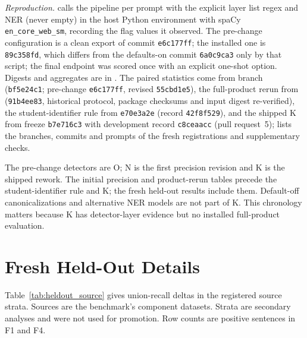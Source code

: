 \documentclass[sigconf]{acmart}
\theoremstyle{acmdefinition}\newtheorem{property}{Property}
\begin{document}
\textit{Reproduction.}  calls the pipeline per prompt with the explicit layer list regex and NER (never empty) in the host Python environment with spaCy \texttt{en\_core\_web\_sm}, recording the flag values it observed. The pre-change configuration is a clean export of commit \texttt{e6c177ff}; the installed one is \texttt{89c358fd}, which differs from the defaults-on commit \texttt{6a0c9ca3} only by that script; the final endpoint was scored once with an explicit one-shot option. Digests and aggregates are in . The paired statistics come from branch  (\texttt{bf5e24c1}; pre-change \texttt{e6c177ff}, revised \texttt{55cbd1e5}), the full-product rerun from  (\texttt{91b4ee83}, historical protocol, package checksums and input digest re-verified), the student-identifier rule from \texttt{e70e3a2e} (record \texttt{42f8f529}), and the shipped K from freeze \texttt{b7e716c3} with development record \texttt{c8ceaacc} (pull request~5);  lists the branches, commits and prompts of the fresh registrations and supplementary checks.

The pre-change detectors are O; N is the first precision revision and K is the shipped rework. The initial precision and product-rerun tables precede the student-identifier rule and K; the fresh held-out results include them. Default-off canonicalizations and alternative NER models are not part of K. This chronology matters because K has detector-layer evidence but no installed full-product evaluation.

\section{Fresh Held-Out Details}
\label{app:heldout}
Table~\ref{tab:heldout_source} gives union-recall deltas in the registered source strata. Sources are the benchmark's component datasets. Strata are secondary analyses and were not used for promotion. Row counts are positive sentences in F1 and F4.
\end{document}
